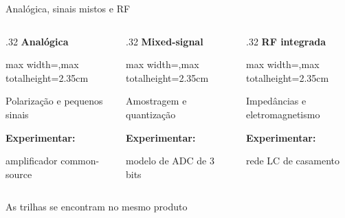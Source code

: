 \begin{frame}{Analógica, sinais mistos e RF}
\begin{columns}[T,onlytextwidth]
\begin{column}{.32\textwidth}\centering
\textcolor{blue_theme}{\textbf{Analógica}}\par
\begin{adjustbox}{max width=\linewidth,max totalheight=2.35cm}\analogicaTrilha\end{adjustbox}\par\smallskip
{\scriptsize Polarização e pequenos sinais\par\medskip\textbf{Experimentar:}\par amplificador common-source}
\end{column}
\begin{column}{.32\textwidth}\centering
\textcolor{ativo}{\textbf{Mixed-signal}}\par
\begin{adjustbox}{max width=\linewidth,max totalheight=2.35cm}\mistoTrilha\end{adjustbox}\par\smallskip
{\scriptsize Amostragem e quantização\par\medskip\textbf{Experimentar:}\par modelo de ADC de 3 bits}
\end{column}
\begin{column}{.32\textwidth}\centering
\textcolor{blue_theme}{\textbf{RF integrada}}\par
\begin{adjustbox}{max width=\linewidth,max totalheight=2.35cm}\rfTrilha\end{adjustbox}\par\smallskip
{\scriptsize Impedâncias e eletromagnetismo\par\medskip\textbf{Experimentar:}\par rede LC de casamento}
\end{column}
\end{columns}
\end{frame}

\begin{frame}{As trilhas se encontram no mesmo produto}
\figura{\produtoIntegrado}
\end{frame}

